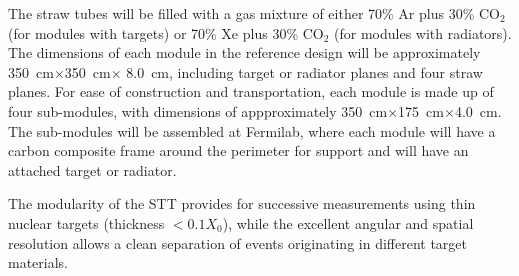 The straw tubes will be filled with a gas mixture of either 70\% Ar
plus 30\% CO$_2$ (for modules with targets) or 70\% Xe plus 30\%
CO$_2$ (for modules with radiators).  The dimensions of each module in
the reference design will be approximately
350~cm$\times$350~cm$\times$ 8.0~cm, including target or radiator
planes and four straw planes. For ease of construction and
transportation, each module is made up of four sub-modules, with
dimensions of appproximately 350~cm$\times$175~cm$\times$4.0~cm.
The sub-modules will be assembled %
at Fermilab, where each module will have a carbon composite frame around 
the perimeter for support and will have an attached target or 
radiator. 

The modularity of the STT provides for successive measurements using
thin nuclear targets (thickness $< 0.1 X_0$), while the excellent
angular and spatial resolution allows a clean separation of events
originating in different target materials.

